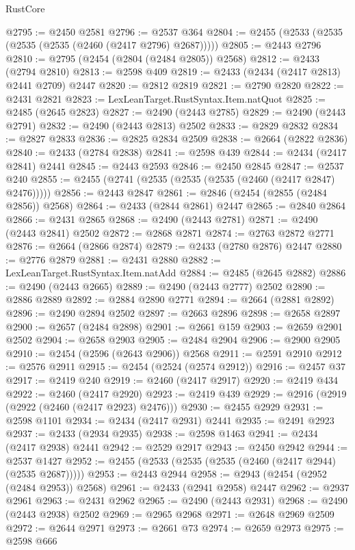 \begin{lexlean}{RustCore}
\begin{coremodule}
@2795 := @2450 @2581
@2796 := @2537 @364
@2804 := @2455 (@2533 (@2535 (@2535 (@2535 (@2460 (@2417 @2796) @2687)))))
@2805 := @2443 @2796
@2810 := @2795 (@2454 (@2804 (@2484 @2805)) @2568)
@2812 := @2433 (@2794 @2810)
@2813 := @2598 @409
@2819 := @2433 (@2434 (@2417 @2813) @2441 @2709) @2447
@2820 := @2812 @2819
@2821 := @2790 @2820
@2822 := @2431 @2821
@2823 := LexLeanTarget.RustSyntax.Item.natQuot
@2825 := @2485 (@2645 @2823)
@2827 := @2490 (@2443 @2785)
@2829 := @2490 (@2443 @2791)
@2832 := @2490 (@2443 @2813) @2502
@2833 := @2829 @2832
@2834 := @2827 @2833
@2836 := @2825 @2834 @2509
@2838 := @2664 (@2822 @2836)
@2840 := @2433 (@2784 @2838)
@2841 := @2598 @439
@2844 := @2434 (@2417 @2841) @2441
@2845 := @2443 @2593
@2846 := @2450 @2845
@2847 := @2537 @240
@2855 := @2455 (@2741 (@2535 (@2535 (@2535 (@2460 (@2417 @2847) @2476)))))
@2856 := @2443 @2847
@2861 := @2846 (@2454 (@2855 (@2484 @2856)) @2568)
@2864 := @2433 (@2844 @2861) @2447
@2865 := @2840 @2864
@2866 := @2431 @2865
@2868 := @2490 (@2443 @2781)
@2871 := @2490 (@2443 @2841) @2502
@2872 := @2868 @2871
@2874 := @2763 @2872 @2771
@2876 := @2664 (@2866 @2874)
@2879 := @2433 (@2780 @2876) @2447
@2880 := @2776 @2879
@2881 := @2431 @2880
@2882 := LexLeanTarget.RustSyntax.Item.natAdd
@2884 := @2485 (@2645 @2882)
@2886 := @2490 (@2443 @2665)
@2889 := @2490 (@2443 @2777) @2502
@2890 := @2886 @2889
@2892 := @2884 @2890 @2771
@2894 := @2664 (@2881 @2892)
@2896 := @2490 @2894 @2502
@2897 := @2663 @2896
@2898 := @2658 @2897
@2900 := @2657 (@2484 @2898)
@2901 := @2661 @159
@2903 := @2659 @2901 @2502
@2904 := @2658 @2903
@2905 := @2484 @2904
@2906 := @2900 @2905
@2910 := @2454 (@2596 (@2643 @2906)) @2568
@2911 := @2591 @2910
@2912 := @2576 @2911
@2915 := @2454 (@2524 (@2574 @2912))
@2916 := @2457 @37
@2917 := @2419 @240
@2919 := @2460 (@2417 @2917)
@2920 := @2419 @434
@2922 := @2460 (@2417 @2920)
@2923 := @2419 @439
@2929 := @2916 (@2919 (@2922 (@2460 (@2417 @2923) @2476)))
@2930 := @2455 @2929
@2931 := @2598 @1101
@2934 := @2434 (@2417 @2931) @2441
@2935 := @2491 @2923
@2937 := @2433 (@2934 @2935)
@2938 := @2598 @1463
@2941 := @2434 (@2417 @2938) @2441
@2942 := @2529 @2917
@2943 := @2450 @2942
@2944 := @2537 @1427
@2952 := @2455 (@2533 (@2535 (@2535 (@2460 (@2417 @2944) (@2535 @2687)))))
@2953 := @2443 @2944
@2958 := @2943 (@2454 (@2952 (@2484 @2953)) @2568)
@2961 := @2433 (@2941 @2958) @2447
@2962 := @2937 @2961
@2963 := @2431 @2962
@2965 := @2490 (@2443 @2931)
@2968 := @2490 (@2443 @2938) @2502
@2969 := @2965 @2968
@2971 := @2648 @2969 @2509
@2972 := @2644 @2971
@2973 := @2661 @73
@2974 := @2659 @2973
@2975 := @2598 @666

\end{coremodule}
\end{lexlean}
